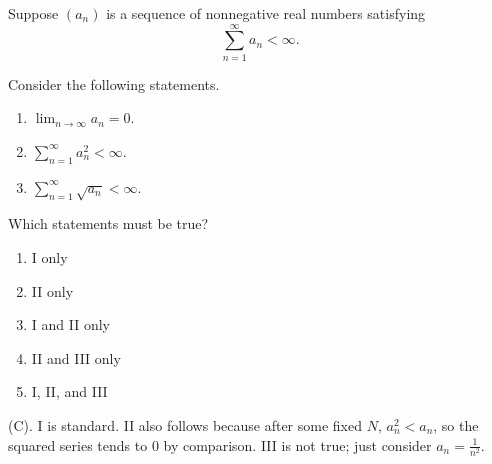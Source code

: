 \begin{exercise}
Suppose $(a_n)$ is a sequence of
nonnegative real numbers satisfying
\[
\sum_{n=1}^{\infty}a_n<\infty.
\]

Consider the following statements.

\begin{enumerate}[label=\Roman*.]
    \item
    $\displaystyle\lim_{n\to\infty}a_n=0$.

    \item
    $\displaystyle
    \sum_{n=1}^{\infty}a_n^2<\infty$.

    \item
    $\displaystyle
    \sum_{n=1}^{\infty}\sqrt{a_n}<\infty$.
\end{enumerate}

Which statements must be true?

\begin{enumerate}[label=(\Alph*)]
    \item I only
    \item II only
    \item I and II only
    \item II and III only
    \item I, II, and III
\end{enumerate}
\end{exercise}
\begin{solution}
(C). I is standard. II also follows because after some fixed $N$, $a_n^2 < a_n$, so 
the squared series tends to $0$ by comparison. III is not true; just consider 
$a_n = \frac{1}{n^2}$.
\end{solution}


